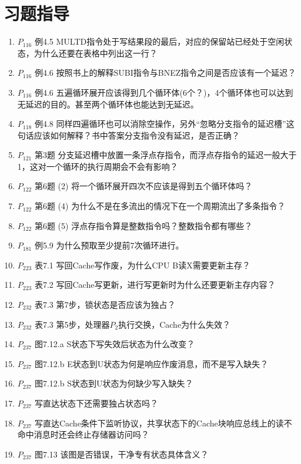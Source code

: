 \documentclass[a4paper]{ctexart}
\begin{document}
\section{习题指导}
\begin{enumerate}
  \item $P_{116}$ 例4.5 MULTD指令处于写结果段的最后，对应的保留站已经处于空闲状态，为什么还要在表格中列出这一行？
  \item $P_{116}$ 例4.6 按照书上的解释SUBI指令与BNEZ指令之间是否应该有一个延迟？
  \item $P_{116}$ 例4.6 五遍循环展开应该得到几个循环体(6个？)，4个循环体也可以达到无延迟的目的。甚至两个循环体也能达到无延迟。
  \item $P_{118}$ 例4.8 同样四遍循环也可以消除空操作，另外“忽略分支指令的延迟槽”这句话应该如何解释？书中答案分支指令没有延迟，是否正确？
  \item $P_{121}$ 第3题 分支延迟槽中放置一条浮点存指令，而浮点存指令的延迟一般大于1，这对一个循环的执行周期会不会有影响？
  \item $P_{122}$ 第6题 (2) 将一个循环展开四次不应该是得到五个循环体吗？
  \item $P_{122}$ 第6题 (4) 为什么不是在多流出的情况下在一个周期流出了多条指令？
  \item $P_{122}$ 第6题 (5) 浮点存指令算是整数指令吗？整数指令都有哪些？
  \item $P_{181}$ 例5.9 为什么预取至少提前7次循环进行。
  \item $P_{223}$ 表7.1 写回Cache写作废，为什么CPU B读X需要更新主存？
  \item $P_{223}$ 表7.2 写回Cache写更新，进行写更新时为什么还要更新主存内容？
  \item $P_{232}$ 表7.3 第7步，锁状态是否应该为独占？
  \item $P_{232}$ 表7.3 第5步，处理器$P_2$执行交换，Cache为什么失效？
  \item $P_{237}$ 图7.12.a S状态下写失效后状态为什么改变？
  \item $P_{237}$ 图7.12.b E状态到U状态为何是响应作废消息，而不是写入缺失？
  \item $P_{237}$ 图7.12.b S状态到U状态为何缺少写入缺失？
  \item $P_{237}$ 写直达状态下还需要独占状态吗？
  \item $P_{237}$ 写直达Cache条件下监听协议，共享状态下的Cache块响应总线上的读不命中消息时还会终止存储器访问吗？
  \item $P_{237}$ 图7.13 该图是否错误，干净专有状态具体含义？
\end{enumerate}
\end{document}
